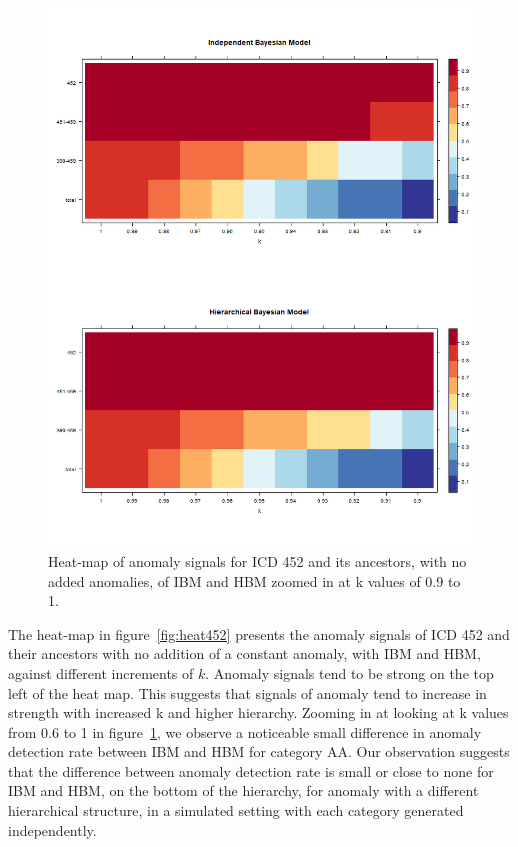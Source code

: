 \begin{figure}[!h]
	\centering
	\includegraphics[width=1\linewidth]{../../R-codes/JAGS/plots/mimic/heat4522}
	\caption{Heat-map of anomaly signals for ICD 452 and its ancestors, with no added anomalies, of IBM and HBM zoomed in at k values of 0.9 to 1.}
	\label{fig:heat4522}
\end{figure}

\newpage

The heat-map in figure~\ref{fig:heat452} presents the anomaly signals of ICD  452 and their ancestors with no addition of a constant anomaly, with IBM and HBM, against different increments of $k$. Anomaly signals tend to be strong on the top left of the heat map. This suggests that signals of anomaly tend to increase in strength with increased k and higher hierarchy. Zooming in at looking at k values from 0.6 to 1 in figure~\ref{fig:heat4522}, we observe a noticeable small difference in anomaly detection rate between IBM and HBM for category AA. Our observation suggests that the difference between anomaly detection rate is small or close to none for IBM and HBM, on the bottom of the hierarchy, for anomaly with a different hierarchical structure, in a simulated setting with each category generated independently.

